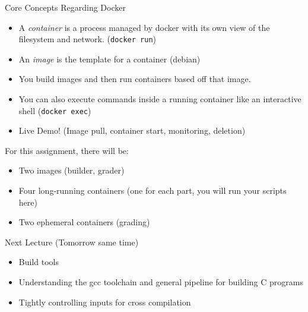 \documentclass{../lecture}
\begin{document}
\begin{frame}{Core Concepts Regarding Docker}
  \begin{itemize}
    \item A \textit{container} is a process managed by docker with its own view of the
      filesystem and network. (\texttt{docker run})
    \item An \textit{image} is the template for a container (debian)
    \item You build images and then run containers based off that image.
    \item You can also execute commands inside a running container like an
      interactive shell (\texttt{docker exec})
    \item Live Demo! (Image pull, container start, monitoring, deletion)
  \end{itemize}
  For this assignment, there will be:
  \begin{itemize}
    \item Two images (builder, grader)
    \item Four long-running containers (one for each part, you will run your
      scripts here)
    \item Two ephemeral containers (grading)
  \end{itemize}
\end{frame}

\begin{frame}{Next Lecture (Tomorrow same time)}
  \begin{itemize}
    \item Build tools
    \item Understanding the gcc toolchain and general pipeline for building C
      programs
    \item Tightly controlling inputs for cross compilation
  \end{itemize}
\end{frame}
\end{document}
